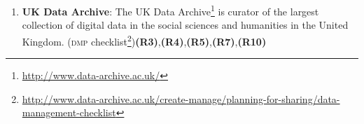 \documentclass[runningheads,a4paper]{llncs}
\newcommand{\dmp}{{\scshape dmp}\xspace}
\newcommand\footnoteurl[1]{\footnote{\scriptsize\url{#1}}}
\begin{document}
\begin{enumerate}
\item \textbf{UK Data Archive}: The UK Data Archive\footnoteurl{http://www.data-archive.ac.uk/} is curator of the largest collection of digital data in the social sciences and humanities in the United Kingdom. (\dmp checklist\footnoteurl{http://www.data-archive.ac.uk/create-manage/planning-for-sharing/data-management-checklist})\textbf{(R3)},\textbf{(R4)},\textbf{(R5)},\textbf{(R7)},\textbf{(R10)}\label{fbitem:ukda}
\end{enumerate}
\fi
\end{document}

